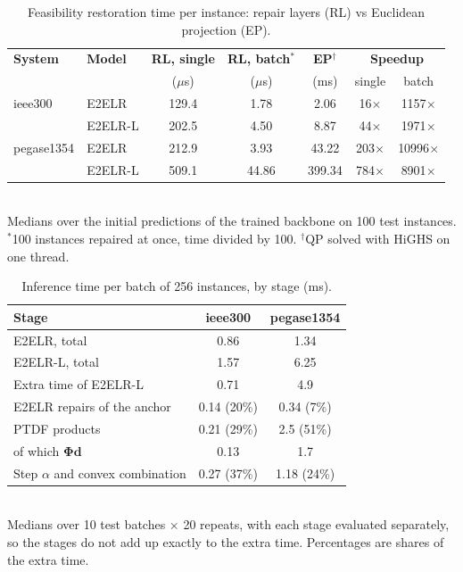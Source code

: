 \documentclass[12pt]{article}
\begin{document}
\begin{table}[!ht]
\centering
\caption{Feasibility restoration time per instance: repair layers (RL) vs Euclidean projection (EP).}
\label{tab:repair_vs_projection}
{\small
\begin{tabular}{llccccc}
\toprule
\textbf{System} & \textbf{Model} & \textbf{RL, single} & \textbf{RL, batch}$^{*}$ & \textbf{EP}$^{\dagger}$ & \multicolumn{2}{c}{\textbf{Speedup}} \\
 & & ($\mu$s) & ($\mu$s) & (ms) & single & batch \\
\midrule
ieee300    & E2ELR   & 129.4 & 1.78 & 2.06 & 16$\times$ & 1157$\times$ \\
           & E2ELR-L & 202.5 & 4.50 & 8.87 & 44$\times$ & 1971$\times$ \\
\midrule
pegase1354 & E2ELR   & 212.9 & 3.93 & 43.22 & 203$\times$ & 10996$\times$ \\
           & E2ELR-L & 509.1 & 44.86 & 399.34 & 784$\times$ & 8901$\times$ \\
\bottomrule
\end{tabular}}\\[2pt]
{\footnotesize Medians over the initial predictions of the trained backbone on 100 test instances. $^{*}$100 instances repaired at once, time divided by 100. $^{\dagger}$QP solved with HiGHS on one thread.}
\end{table}

\begin{table}[!ht]
\centering
\caption{Inference time per batch of 256 instances, by stage (ms).}
\label{tab:inference_breakdown}
{\small
\begin{tabular}{lcc}
\toprule
\textbf{Stage} & \textbf{ieee300} & \textbf{pegase1354} \\
\midrule
E2ELR, total   & 0.86 & 1.34 \\
E2ELR-L, total & 1.57 & 6.25 \\
\midrule
Extra time of E2ELR-L & 0.71 & 4.9 \\
\quad E2ELR repairs of the anchor & 0.14 (20\%) & 0.34 (7\%) \\
\quad PTDF products & 0.21 (29\%) & 2.5 (51\%) \\
\quad\quad of which $\boldsymbol{\Phi}\boldsymbol{d}$ & 0.13 & 1.7 \\
\quad Step $\alpha$ and convex combination & 0.27 (37\%) & 1.18 (24\%) \\
\bottomrule
\end{tabular}}\\[2pt]
{\footnotesize Medians over 10 test batches $\times$ 20 repeats, with each stage evaluated separately, so the stages do not add up exactly to the extra time. Percentages are shares of the extra time.}
\end{table}
\end{document}
